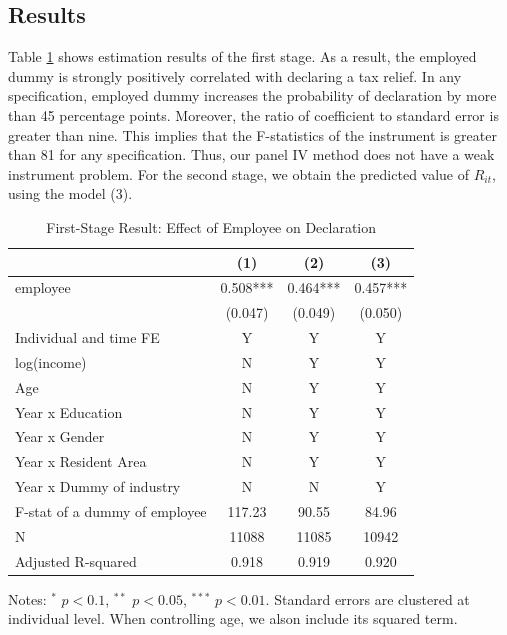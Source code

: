 \documentclass[
  11pt,
  a4paper,
]{article}
\begin{document}
\hypertarget{results-1}{%
\subsection{Results}\label{results-1}}

Table \ref{tab:stage1Report} shows estimation results of the first stage.
As a result, the employed dummy is strongly positively correlated with declaring a tax relief.
In any specification, employed dummy increases the probability of declaration by more than 45 percentage points.
Moreover, the ratio of coefficient to standard error is greater than nine.
This implies that the F-statistics of the instrument is greater than 81 for any specification.
Thus, our panel IV method does not have a weak instrument problem.
For the second stage, we obtain the predicted value of \(R_{it}\), using the model (3).

\begin{table}

\caption{\label{tab:stage1Report}First-Stage Result: Effect of Employee on Declaration}
\centering
\fontsize{9}{11}\selectfont
\begin{threeparttable}
\begin{tabular}[t]{lccc}
\toprule
 & (1) & (2) & (3)\\
\midrule
employee & 0.508*** & 0.464*** & 0.457***\\
 & (0.047) & (0.049) & (0.050)\\
Individual and time FE & Y & Y & Y\\
log(income) & N & Y & Y\\
Age & N & Y & Y\\
Year x Education & N & Y & Y\\
Year x Gender & N & Y & Y\\
Year x Resident Area & N & Y & Y\\
Year x Dummy of industry & N & N & Y\\
F-stat of a dummy of employee & 117.23 & 90.55 & 84.96\\
N & 11088 & 11085 & 10942\\
Adjusted R-squared & 0.918 & 0.919 & 0.920\\
\bottomrule
\end{tabular}
\begin{tablenotes}
\item Notes: $^{*}$ $p < 0.1$, $^{**}$ $p < 0.05$, $^{***}$ $p < 0.01$. Standard errors are clustered at individual level. When controlling age, we alson include its squared term.
\end{tablenotes}
\end{threeparttable}
\end{table}
\end{document}
